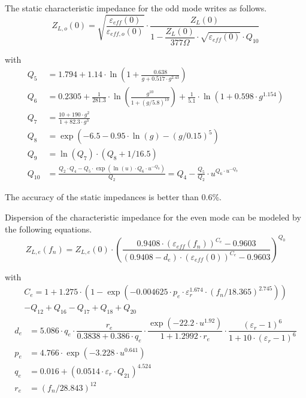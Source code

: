 \addvspace{12pt}

The static characteristic impedance for the odd mode writes as follows.
\begin{equation}
Z_{L,o}(0) = \sqrt{\dfrac{\varepsilon_{eff}(0)}{\varepsilon_{eff,o}(0)}} \cdot
             \dfrac{Z_L(0)}{1 - \dfrac{Z_L(0)}{377\Omega} \cdot \sqrt{\varepsilon_{eff}(0)} \cdot Q_{10}}
\end{equation}

with
\begin{align}
Q_5 &= 1.794 +1.14\cdot\ln\left( 1 + \frac{0.638}{g+0.517\cdot g^{2.43}} \right)\\
Q_6 &= 0.2305 + \frac{1}{281.3}\cdot \ln\left( \frac{g^{10}}{1+\left( g/5.8\right) ^{10}} \right)
     + \frac{1}{5.1}\cdot \ln\left(1+0.598\cdot g^{1.154}\right)\\
Q_7 &= \frac{10+190\cdot g^2}{1+82.3\cdot g^3}\\
Q_8 &= \exp\left( -6.5 - 0.95\cdot\ln\left(g\right) - \left(g/0.15\right)^5 \right)\\
Q_9 &= \ln\left(Q_7\right)\cdot \left( Q_8 + 1/16.5 \right)\\
Q_{10} &= \frac{Q_2\cdot Q_4 - Q_5\cdot\exp\left( \ln\left(u\right)\cdot Q_6\cdot u^{-Q_9} \right)}{Q_2}
       = Q_4 - \frac{Q_5}{Q_2}\cdot u^{Q_6\cdot u^{-Q_9}}
\end{align}

The accuracy of the static impedances is better than 0.6\%.

\addvspace{12pt}

Dispersion of the characteristic impedance for the even mode can be
modeled by the following equations.
\begin{equation}
Z_{L,e}(f_n) = Z_{L,e}(0)\cdot \left( \dfrac{0.9408\cdot (\varepsilon_{eff}(f_n))^{C_e} - 0.9603}
                        {\left(0.9408-d_e\right)\cdot \left(\varepsilon_{eff}(0)\right)^{C_e} - 0.9603} \right) ^{Q_0}
\end{equation}

with
\begin{equation}
\begin{split}
C_e = 1 + 1.275\cdot \left( 1-\exp\left( -0.004625\cdot p_e\cdot \varepsilon_r^{1.674}\cdot
      \left( f_n/18.365 \right) ^{2.745} \right) \right)\\
      - Q_{12}+Q_{16}-Q_{17}+Q_{18}+Q_{20}
\end{split}
\end{equation}
\begin{align}
d_e &= 5.086\cdot q_e\cdot\dfrac{r_e}{0.3838+0.386\cdot q_e}\cdot
      \dfrac{\exp\left(-22.2\cdot u^{1.92}\right)}{1+1.2992\cdot r_e}\cdot
      \dfrac{(\varepsilon_r-1)^6}{1 + 10\cdot (\varepsilon_r-1)^6}\\
p_e &= 4.766\cdot \exp \left(-3.228\cdot u^{0.641}\right)\\
q_e &= 0.016 + \left(0.0514\cdot \varepsilon_r\cdot Q_{21}\right)^{4.524}\\
r_e &= \left( f_n/28.843 \right) ^{12}
\end{align}

